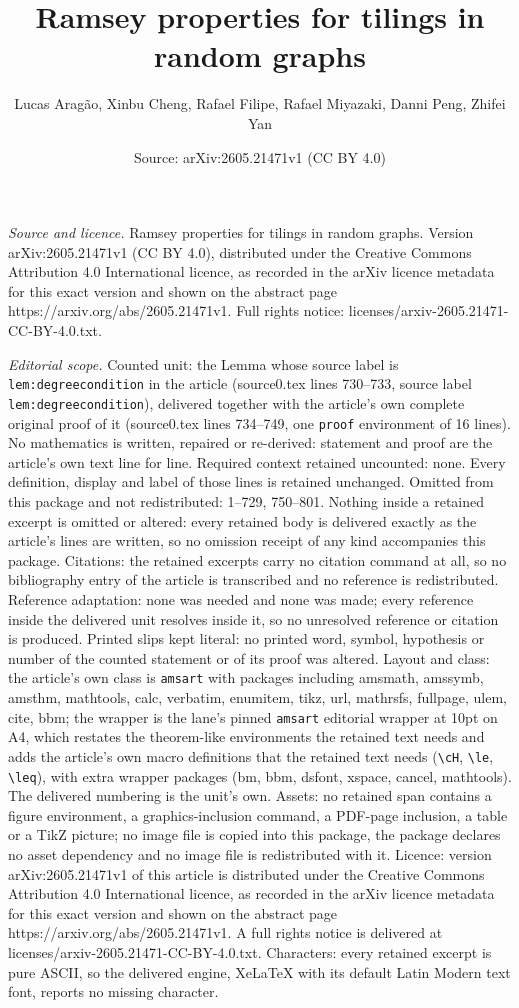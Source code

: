\documentclass[10pt,a4paper]{amsart}
\title[Ramsey properties for tilings in random graphs]{Ramsey properties for tilings in random graphs}
\author{Lucas Arag\~ao, Xinbu Cheng, Rafael Filipe, Rafael Miyazaki, Danni Peng, Zhifei Yan}
\date{Source: arXiv:2605.21471v1 (CC BY 4.0)}
\begin{document}
\maketitle

\noindent\emph{Source and licence.} Ramsey properties for tilings in random graphs. Version arXiv:2605.21471v1 (CC BY 4.0), distributed under the Creative Commons Attribution 4.0 International licence, as recorded in the arXiv licence metadata for this exact version and shown on the abstract page https://arxiv.org/abs/2605.21471v1. Full rights notice: licenses/arxiv-2605.21471-CC-BY-4.0.txt.\par\smallskip

\noindent\textit{Editorial scope.} Counted unit: the Lemma whose source label is \texttt{lem:degreecondition} in the article (source0.tex lines 730--733, source label \texttt{lem:degreecondition}), delivered together with the article's own complete original proof of it (source0.tex lines 734--749, one \texttt{proof} environment of 16 lines). No mathematics is written, repaired or re-derived: statement and proof are the article's own text line for line. Required context retained uncounted: none. Every definition, display and label of those lines is retained unchanged. Omitted from this package and not redistributed: 1--729, 750--801. Nothing inside a retained excerpt is omitted or altered: every retained body is delivered exactly as the article's lines are written, so no omission receipt of any kind accompanies this package. Citations: the retained excerpts carry no citation command at all, so no bibliography entry of the article is transcribed and no reference is redistributed. Reference adaptation: none was needed and none was made; every reference inside the delivered unit resolves inside it, so no unresolved reference or citation is produced. Printed slips kept literal: no printed word, symbol, hypothesis or number of the counted statement or of its proof was altered. Layout and class: the article's own class is \texttt{amsart} with packages including amsmath, amssymb, amsthm, mathtools, calc, verbatim, enumitem, tikz, url, mathrsfs, fullpage, ulem, cite, bbm; the wrapper is the lane's pinned \texttt{amsart} editorial wrapper at 10pt on A4, which restates the theorem-like environments the retained text needs and adds the article's own macro definitions that the retained text needs (\texttt{\textbackslash cH}, \texttt{\textbackslash le}, \texttt{\textbackslash leq}), with extra wrapper packages (bm, bbm, dsfont, xspace, cancel, mathtools). The delivered numbering is the unit's own. Assets: no retained span contains a figure environment, a graphics-inclusion command, a PDF-page inclusion, a table or a TikZ picture; no image file is copied into this package, the package declares no asset dependency and no image file is redistributed with it. Licence: version arXiv:2605.21471v1 of this article is distributed under the Creative Commons Attribution 4.0 International licence, as recorded in the arXiv licence metadata for this exact version and shown on the abstract page https://arxiv.org/abs/2605.21471v1. A full rights notice is delivered at licenses/arxiv-2605.21471-CC-BY-4.0.txt. Characters: every retained excerpt is pure ASCII, so the delivered engine, XeLaTeX with its default Latin Modern text font, reports no missing character.
\end{document}
